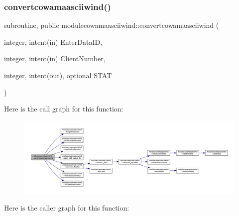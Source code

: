 \subsubsection{\texorpdfstring{convertcowamaasciiwind()}{convertcowamaasciiwind()}}
{\footnotesize\ttfamily subroutine, public modulecowamaasciiwind\+::convertcowamaasciiwind (\begin{DoxyParamCaption}\item[{integer, intent(in)}]{Enter\+Data\+ID,  }\item[{integer, intent(in)}]{Client\+Number,  }\item[{integer, intent(out), optional}]{S\+T\+AT }\end{DoxyParamCaption})}

Here is the call graph for this function\+:\nopagebreak
\begin{figure}[H]
\begin{center}
\leavevmode
\includegraphics[width=350pt]{namespacemodulecowamaasciiwind_a76bf63c9a36126aed55309270f63abe4_cgraph}
\end{center}
\end{figure}
Here is the caller graph for this function\+:\nopagebreak
